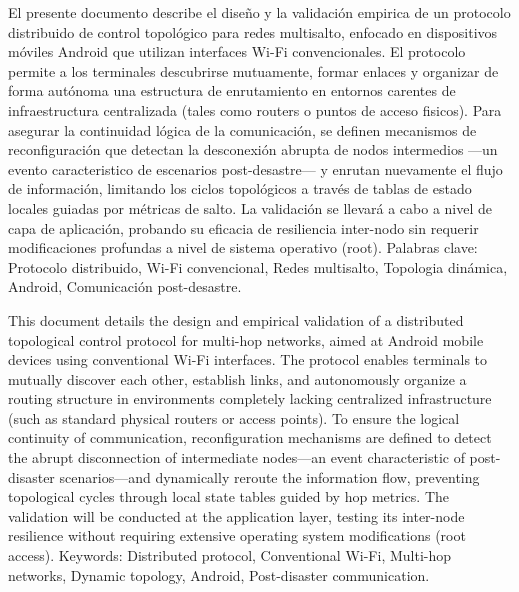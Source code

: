 

El presente documento describe el diseño y la validación empirica de un protocolo distribuido de control topológico para redes multisalto, enfocado en dispositivos móviles Android que utilizan interfaces Wi-Fi convencionales. El protocolo permite a los terminales descubrirse mutuamente, formar enlaces y organizar de forma autónoma una estructura de enrutamiento en entornos carentes de infraestructura centralizada (tales como routers o puntos de acceso fisicos). Para asegurar la continuidad lógica de la comunicación, se definen mecanismos de reconfiguración que detectan la desconexión abrupta de nodos intermedios ---un evento caracteristico de escenarios post-desastre--- y enrutan nuevamente el flujo de información, limitando los ciclos topológicos a través de tablas de estado locales guiadas por métricas de salto. La validación se llevará a cabo a nivel de capa de aplicación, probando su eficacia de resiliencia inter-nodo sin requerir modificaciones profundas a nivel de sistema operativo (root). Palabras clave: Protocolo distribuido, Wi-Fi convencional, Redes multisalto, Topologia dinámica, Android, Comunicación post-desastre.

\newpage
{}

This document details the design and empirical validation of a distributed topological control protocol for multi-hop networks, aimed at Android mobile devices using conventional Wi-Fi interfaces. The protocol enables terminals to mutually discover each other, establish links, and autonomously organize a routing structure in environments completely lacking centralized infrastructure (such as standard physical routers or access points). To ensure the logical continuity of communication, reconfiguration mechanisms are defined to detect the abrupt disconnection of intermediate nodes---an event characteristic of post-disaster scenarios---and dynamically reroute the information flow, preventing topological cycles through local state tables guided by hop metrics. The validation will be conducted at the application layer, testing its inter-node resilience without requiring extensive operating system modifications (root access). Keywords: Distributed protocol, Conventional Wi-Fi, Multi-hop networks, Dynamic topology, Android, Post-disaster communication.

\newpage
{}


